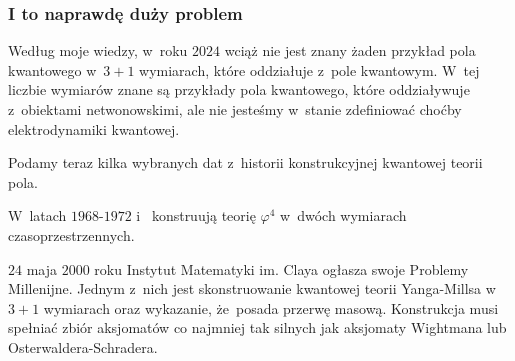 \documentclass[10pt,t]{beamer}
\begin{document}
\begin{frame}
  \frametitle{I to naprawdę duży problem}


  Według moje wiedzy, w~roku $2024$ wciąż nie jest znany \alert{żaden}
  przykład pola kwantowego w~$3 + 1$ wymiarach, które oddziałuje z~pole
  kwantowym. W~tej liczbie wymiarów znane są przykłady pola kwantowego,
  które oddziaływuje z~obiektami netwonowskimi, ale nie jesteśmy w~stanie
  zdefiniować choćby elektrodynamiki kwantowej.

  Podamy teraz kilka wybranych dat z~historii konstrukcyjnej kwantowej
  teorii pola.

  W~latach $1968\text{-}1972$
  i~
  konstruują teorię $\varphi^{ 4 }$ w~dwóch wymiarach czasoprzestrzennych.

  $24$ maja $2000$ roku Instytut Matematyki im. Claya ogłasza swoje Problemy
  Millenijne. Jednym z~nich jest skonstruowanie kwantowej teorii
  Yanga-Millsa w~$3 + 1$ wymiarach oraz wykazanie, że~posada przerwę masową.
  Konstrukcja musi spełniać zbiór aksjomatów co najmniej tak
  silnych jak aksjomaty Wightmana lub Osterwaldera-Schradera.

\end{frame}
\end{document}
